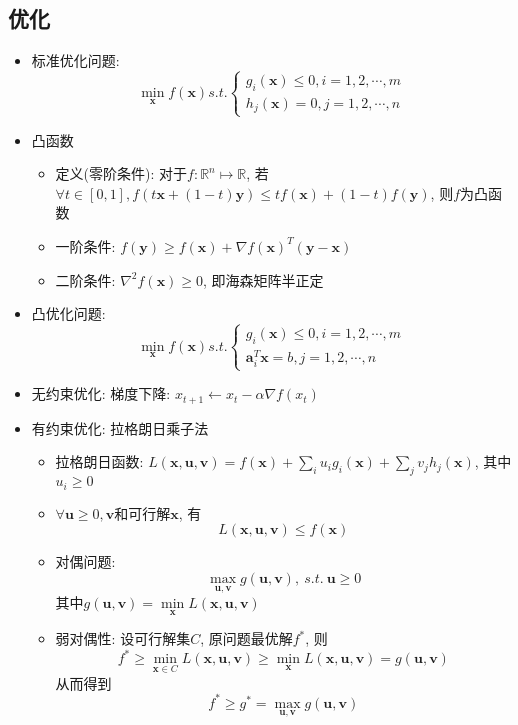 \documentclass[UTF8]{article}
\begin{document}
\subsection{优化}
\begin{itemize}
\item 标准优化问题: $$\min\limits_{\bm{x}}f(\bm{x})
s.t.\left\{\begin{array}{l}g_i(\bm{x})\le0,i=1,2,\cdots,m\\h_j(\bm{x})=0,j=1,2,\cdots,n\end{array}\right.$$
\item 凸函数
	\begin{itemize}
	\item 定义(零阶条件): 对于$f:\mathbb{R}^n\mapsto \mathbb{R}$, 若$\forall t\in[0,1],f(t\bm{x}+(1-t)\bm{y})\le tf(\bm{x})+(1-t)f(\bm{y})$, 则$f$为凸函数
	\item 一阶条件: $f(\bm{y})\ge f(\bm{x})+\nabla f(\bm{x})^T(\bm{y}-\bm{x})$
	\item 二阶条件: $\nabla^2f(\bm{x})\ge 0$, 即海森矩阵半正定
	\end{itemize}
\item 凸优化问题: $$\min\limits_{\bm{x}}f(\bm{x}) s.t.\left\{\begin{array}{l}g_i(\bm{x})\le0,i=1,2,\cdots,m\\\bm{a}_i^T\bm{x}=b,j=1,2,\cdots,n\end{array}\right.$$
\item 无约束优化: 梯度下降: $x_{t+1}\leftarrow x_t-\alpha\nabla f(x_t)$
\item 有约束优化: 拉格朗日乘子法
	\begin{itemize}
	\item 拉格朗日函数: $L(\bm{x},\bm{u},\bm{v})=f(\bm{x})+\sum\limits_iu_ig_i(\bm{x})+\sum\limits_jv_jh_j(\bm{x})$, 其中$u_i\ge0$
	\item $\forall \bm{u}\ge 0,\bm{v}$和可行解$\bm{x}$, 有$$L(\bm{x},\bm{u},\bm{v})\le f(\bm{x})$$
	\item 对偶问题: $$\max\limits_{\bm{u},\bm{v}}g(\bm{u},\bm{v}),\ s.t.\ \bm{u}\ge0$$
	其中$g(\bm{u},\bm{v})=\min\limits_{\bm{x}}L(\bm{x},\bm{u},\bm{v})$
	\item 弱对偶性: 设可行解集$C$, 原问题最优解$f^*$, 则$$f^*\ge\min\limits_{\bm{x}\in C}L(\bm{x},\bm{u},\bm{v})\ge\min\limits_{\bm{x}}L(\bm{x},\bm{u},\bm{v})=g(\bm{u},\bm{v})$$
	从而得到$$f^*\ge g^*=\max\limits_{\bm{u},\bm{v}}g(\bm{u},\bm{v})$$
	\end{itemize}
\end{itemize}
\end{document}
